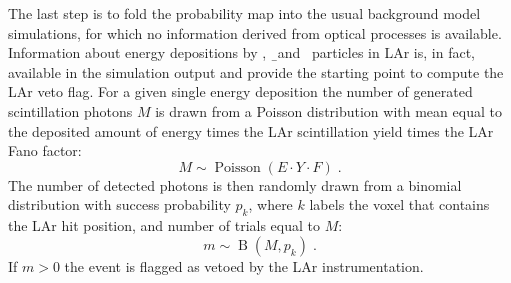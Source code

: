 \newpar
The last step is to fold the probability map into the usual background model simulations,
for which no information derived from optical processes is available. Information about
energy depositions by \g, \b\ and \a\ particles in LAr is, in fact, available in the
simulation output and provide the starting point to compute the LAr veto flag. For a given
single energy deposition the number of generated scintillation photons $M$ is drawn from a
Poisson distribution with mean equal to the deposited amount of energy times the LAr
scintillation yield times the LAr Fano factor:
\[
  M \sim \operatorname{Poisson}(E \cdot Y \cdot F) \;.
\]
The number of detected photons is then randomly drawn from a binomial distribution with
success probability $p_k$, where $k$ labels the voxel that contains the LAr hit position,
and number of trials equal to $M$:
\[
  m \sim \operatorname{B}(M, p_k) \;.
\]
If $m>0$ the event is flagged as vetoed by the LAr instrumentation.

